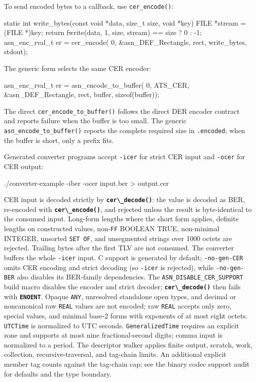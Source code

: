 \documentclass[english,oneside,12pt]{book}
\newcommand{\code}[1]{\texttt{\textbf{\lstinline{#1}}}}
\begin{document}
To send encoded bytes to a callback, use \texttt{cer\_encode()}:

\begin{codesample}[basicstyle=\scriptsize\listingfont,literate={-}{{\char45}}1]
static int write_bytes(const void *data, size_t size, void *key) {
    FILE *stream = (FILE *)key;
    return fwrite(data, 1, size, stream) == size ? 0 : -1;
}
asn_enc_rval_t er = cer_encode(
    0, &asn_DEF_Rectangle, rect, write_bytes, stdout);
\end{codesample}

The generic form selects the same CER encoder:

\begin{codesample}[basicstyle=\scriptsize\listingfont,literate={-}{{\char45}}1]
asn_enc_rval_t er = asn_encode_to_buffer(
    0, ATS_CER, &asn_DEF_Rectangle, rect, buffer, sizeof(buffer));
\end{codesample}

The direct \texttt{cer\_encode\_to\_buffer()} follows the direct DER
encoder contract and reports failure when the buffer is too small. The generic
\texttt{asn\_encode\_to\_buffer()} reports the complete required size in
\texttt{.encoded}; when the buffer is short, only a prefix fits.

Generated converter programs accept \texttt{-icer} for strict CER input and
\texttt{-ocer} for CER output:

\begin{bash}[literate={-}{{\char45}}1]
./converter-example -iber -ocer input.ber > output.cer
\end{bash}

CER input is decoded strictly by \code{cer\_decode()}: the value is decoded
as BER, re-encoded with \code{cer\_encode()}, and rejected unless the result
is byte-identical to the consumed input. Long-form lengths where the short
form applies, definite lengths on constructed values, non-\texttt{FF} BOOLEAN
TRUE, non-minimal INTEGER, unsorted \texttt{SET OF}, and unsegmented strings
over 1000 octets are rejected. Trailing bytes after the first TLV are not
consumed. The converter buffers the whole \texttt{-icer} input. C support is
generated by default; \texttt{-no-gen-CER} omits CER encoding and strict
decoding (so \texttt{-icer} is rejected), while \texttt{-no-gen-BER} also
disables its BER-family dependencies. The
\texttt{ASN\_DISABLE\_CER\_SUPPORT} build macro disables the encoder and
strict decoder; \code{cer\_decode()} then fails with \code{ENOENT}. Opaque \texttt{ANY}, unresolved
standalone open types, and decimal or noncanonical raw \texttt{REAL} values
are not encoded; raw \texttt{REAL} accepts only zero, special values, and
minimal base-2 forms with exponents of at most eight octets. \texttt{UTCTime}
is normalized to UTC seconds. \texttt{GeneralizedTime} requires an explicit
zone and supports at most nine fractional-second digits; comma input is
normalized to a period. The descriptor walker applies finite output, scratch,
work, collection, recursive-traversal, and tag-chain limits. An additional
explicit member tag counts against the tag-chain cap; see the binary codec
support audit for defaults and the type boundary.
\end{document}
